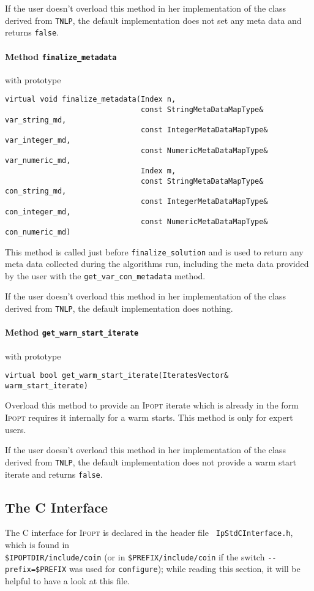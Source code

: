 \documentclass[10pt]{article}
\newcommand{\Ipopt}{\textsc{Ipopt}\xspace}
\begin{document}
If the user doesn't overload this method in her implementation of the class 
derived from {\tt TNLP}, the default implementation does not set any meta data 
and returns {\tt false}.

\paragraph{Method \texttt{finalize\_metadata}} with prototype
\begin{verbatim}
virtual void finalize_metadata(Index n,
                               const StringMetaDataMapType& var_string_md,
                               const IntegerMetaDataMapType& var_integer_md,
                               const NumericMetaDataMapType& var_numeric_md,
                               Index m,
                               const StringMetaDataMapType& con_string_md,
                               const IntegerMetaDataMapType& con_integer_md,
                               const NumericMetaDataMapType& con_numeric_md)
\end{verbatim}

This method is called just before {\tt finalize\_solution} and is used to
return any meta data collected during the algorithms run, including the meta 
data provided by the user with the {\tt get\_var\_con\_metadata} method.

If the user doesn't overload this method in her implementation of the class 
derived from {\tt TNLP}, the default implementation does nothing.

\paragraph{Method \texttt{get\_warm\_start\_iterate}} with prototype
\begin{verbatim}
virtual bool get_warm_start_iterate(IteratesVector& warm_start_iterate)
\end{verbatim}

Overload this method to provide an \Ipopt iterate which is already in the form 
\Ipopt requires it internally for a warm starts.
This method is only for expert users.

If the user doesn't overload this method in her implementation of the class 
derived from {\tt TNLP}, the default implementation does not provide a warm 
start iterate and returns {\tt false}.


\subsection{The C Interface} \label{sec.cinterface}
The C interface for \Ipopt is declared in the header file {\tt
  IpStdCInterface.h}, which is found in\\
\texttt{\$IPOPTDIR/include/coin} (or in
\texttt{\$PREFIX/include/coin} if the switch
\verb|--prefix=$PREFIX| was used for {\tt configure}); while  %
reading this section, it will be helpful to have a look at this file.
\end{document}
